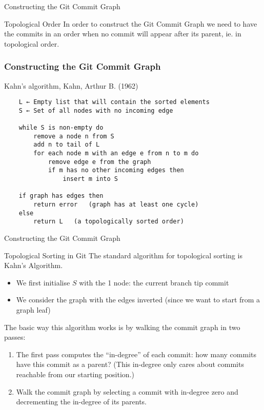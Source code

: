 \documentclass{beamer}
\begin{document}
\begin{frame}{Constructing the Git Commit Graph}
  \begin{block}{Topological Order}
    In order to construct the Git Commit Graph we need to have the commits in an order when no commit will appear after its parent, ie. in topological order.
  \end{block}
\end{frame}
\begin{frame}[fragile]
  \frametitle{Constructing the Git Commit Graph}
  \begin{block}{Kahn's algorithm, Kahn, Arthur B. (1962)}
    \begin{verbatim}
    L ← Empty list that will contain the sorted elements
    S ← Set of all nodes with no incoming edge

    while S is non-empty do
        remove a node n from S
        add n to tail of L
        for each node m with an edge e from n to m do
            remove edge e from the graph
            if m has no other incoming edges then
                insert m into S

    if graph has edges then
        return error   (graph has at least one cycle)
    else
        return L   (a topologically sorted order)
    \end{verbatim}
  \end{block}
\end{frame}
\begin{frame}{Constructing the Git Commit Graph}
  \begin{block}{Topological Sorting in Git}
    The standard algorithm for topological sorting is Kahn’s Algorithm.
    \begin{itemize}
      \item We first initialise $S$ with the 1 node: the current branch tip commit
      \item We consider the graph with the edges inverted (since we want to start from a graph leaf)
    \end{itemize}
    The basic way this algorithm works is by walking the commit graph in two passes:
    \begin{enumerate}
      \item The first pass computes the “in-degree” of each commit: how many commits have this commit as a parent? (This in-degree only cares about commits reachable from our starting position.)
      \item Walk the commit graph by selecting a commit with in-degree zero and decrementing the in-degree of its parents.
    \end{enumerate}
  \end{block}
\end{frame}
\end{document}
